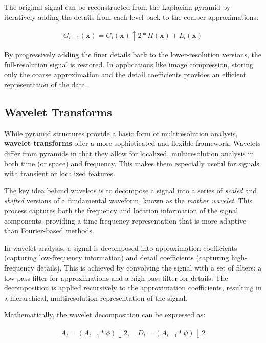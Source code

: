 The original signal can be reconstructed from the Laplacian pyramid by iteratively adding the details from each level back to the coarser approximations:

\begin{align}
  G_{l-1}(\mathbf{x}) = G_l(\mathbf{x}) \uparrow 2 * H(\mathbf{x}) + L_l(\mathbf{x})
\end{align}

By progressively adding the finer details back to the lower-resolution versions, the full-resolution signal is restored. In applications like image compression, storing only the coarse approximation and the detail coefficients provides an efficient representation of the data.

\subsection{Wavelet Transforms}

While pyramid structures provide a basic form of multiresolution analysis, \textbf{wavelet transforms} offer a more sophisticated and flexible framework. Wavelets differ from pyramids in that they allow for localized, multiresolution analysis in both time (or space) and frequency. This makes them especially useful for signals with transient or localized features.

The key idea behind wavelets is to decompose a signal into a series of \textit{scaled} and \textit{shifted} versions of a fundamental waveform, known as the \textit{mother wavelet}. This process captures both the frequency and location information of the signal components, providing a time-frequency representation that is more adaptive than Fourier-based methods.

In wavelet analysis, a signal is decomposed into approximation coefficients (capturing low-frequency information) and detail coefficients (capturing high-frequency details). This is achieved by convolving the signal with a set of filters: a low-pass filter for approximations and a high-pass filter for details. The decomposition is applied recursively to the approximation coefficients, resulting in a hierarchical, multiresolution representation of the signal.

Mathematically, the wavelet decomposition can be expressed as:

\begin{align}
  A_l = (A_{l-1} * \phi) \downarrow 2, \quad D_l = (A_{l-1} * \psi) \downarrow 2
\end{align}

